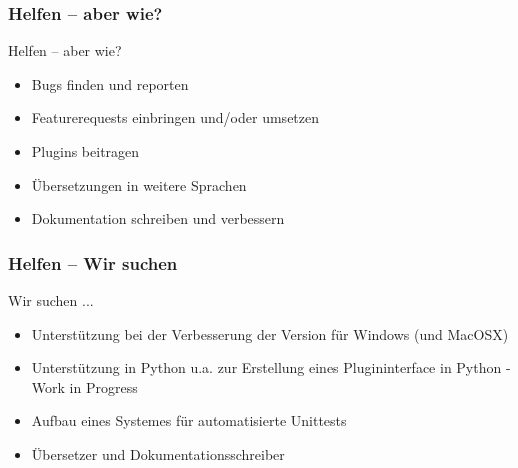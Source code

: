 \begin{frame}
	\frametitle{Helfen -- aber wie?}
	\begin{block}{Helfen -- aber wie?}
		\begin{itemize}
			\item Bugs finden und reporten
			\item Featurerequests einbringen und/oder umsetzen
			\item Plugins beitragen
			\item Übersetzungen in weitere Sprachen
			\item Dokumentation schreiben und verbessern
		\end{itemize}
	\end{block}
\end{frame}
\begin{frame}
	\frametitle{Helfen -- Wir suchen}
	\begin{block}{Wir suchen ... }
		\begin{itemize}
			\item Unterstützung bei der Verbesserung der Version für
				  Windows (und MacOSX)
			\item Unterstützung in Python u.a. zur Erstellung eines
				  Plugininterface in Python - Work in Progress
			\item Aufbau eines Systemes für automatisierte Unittests
			\item Übersetzer und Dokumentationsschreiber
		\end{itemize}
	\end{block}
\end{frame}

